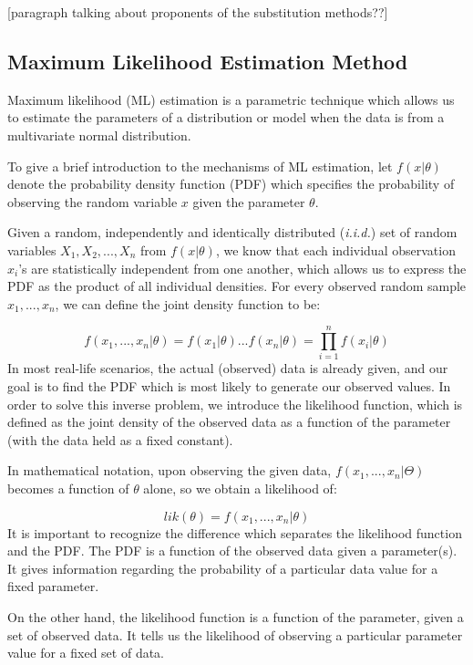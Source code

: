 \documentclass[12pt, twoside]{amherstthesis}
\begin{document}
{[}paragraph talking about proponents of the substitution methods??{]}

\hypertarget{MLE}{%
\subsection{Maximum Likelihood Estimation Method}\label{MLE}}

Maximum likelihood (ML) estimation is a parametric technique which allows us to estimate the parameters of a distribution or model when the data is from a multivariate normal distribution.

To give a brief introduction to the mechanisms of ML estimation, let \(f(x|\theta)\) denote the probability density function (PDF) which specifies the probability of observing the random variable \(x\) given the parameter \(\theta\).

Given a random, independently and identically distributed (\emph{i.i.d.}) set of random variables \(X_1, X_2,...,X_n\) from \(f(x|\theta)\), we know that each individual observation \(x_i\)'s are statistically independent from one another, which allows us to express the PDF as the product of all individual densities. For every observed random sample \(x_1,...,x_n\), we can define the joint density function to be:

\[f(x_1,...,x_n|\theta) = f(x_1|\theta)...f(x_n|\theta) = \prod_{i=1}^{n}f(x_i|\theta)\]
In most real-life scenarios, the actual (observed) data is already given, and our goal is to find the PDF which is most likely to generate our observed values. In order to solve this inverse problem, we introduce the likelihood function, which is defined as the joint density of the observed data as a function of the parameter (with the data held as a fixed constant).

In mathematical notation, upon observing the given data, \(f(x_1,...,x_n|\Theta)\) becomes a function of \(\theta\) alone, so we obtain a likelihood of:

\[lik(\theta) = f(x_1,...,x_n|\theta)\]
It is important to recognize the difference which separates the likelihood function and the PDF. The PDF is a function of the observed data given a parameter(s). It gives information regarding the probability of a particular data value for a fixed parameter.

On the other hand, the likelihood function is a function of the parameter, given a set of observed data. It tells us the likelihood of observing a particular parameter value for a fixed set of data.
\end{document}
